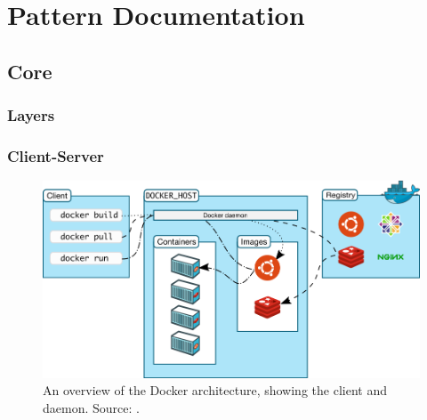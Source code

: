 
\clearpage
\chapter{Pattern Documentation}
\label{ch:patterns}


\section{Core}
\subsection{Layers}

\subsection{Client-Server}
\begin{figure}[H]
\caption{An overview of the Docker architecture, showing the client and daemon. Source: \cite{dockerarchi}.}
\centering
\includegraphics[scale=0.4]{4-softwarearch/images/architecture.png}
\end{figure}

